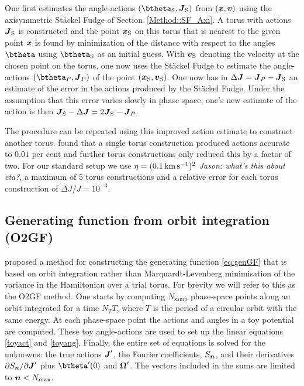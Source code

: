 \documentclass[useAMS,usenatbib,fleqn,a4paper]{mn2e}
\def\kms{\,{\rm km\,s^{-1}}}
\def\percent{\text{ per cent}}
\newcommand{\bs}[1]{\bmath{#1}}
\def\percent{\text{ per cent}}
\begin{document}
One first estimates the angle-actions $(\btheta_{\rm S},\boldsymbol{J}_{\rm S})$ from
$(\bs{x},\bs{v})$ using the axisymmetric St\"ackel Fudge of
Section~\ref{Method::SF_Axi}. A torus with actions $\boldsymbol{J}_{\rm S}$ is
constructed and the point $\bs{x}_{\rm S}$ on this torus that is nearest to the
given point $\bs{x}$ is found by minimization of the distance with respect to
the angles $\btheta$ using $\btheta_{\rm S}$ as an initial guess. With $\bs{v}_{\rm S}$
denoting the velocity at the chosen point on the torus, one now uses the
St\"ackel Fudge to estimate the angle-actions $(\btheta_P,\boldsymbol{J}_P)$
of the point $(\bs{x}_{\rm S},\bs{v}_{\rm S})$. One now has in
$\Delta\bs{J}=\bs{J}_P-\bs{J}_{\rm S}$ an estimate of the error in the actions
produced by the St\"ackel Fudge.  Under the
assumption that this error varies slowly in phase space, one's new estimate
of the action is then
$\boldsymbol{J}_{\rm S}-\Delta\boldsymbol{J}=2\boldsymbol{J}_{\rm S}-\boldsymbol{J}_P$.

The procedure can be repeated using this improved action estimate to
construct another torus. \cite{SandersBinney2015} found that a single torus
construction produced actions accurate to $0.01\percent$ and further torus
constructions only reduced this by a factor of two. For our standard setup we
use $\eta=(0.1\kms)^2$ {\sl Jason: what's this about eta?}, a maximum of $5$ torus constructions and a relative
error for each torus construction of $\Delta J/J=10^{-3}$. 

\subsection{Generating function from orbit integration (O2GF)}\label{Method::Genfunc}

\cite{SandersBinney2014} proposed a method for constructing the generating
function \eqref{eq:genGF} that is based on orbit integration rather than
Marquardt-Levenberg minimisation of the variance in the Hamiltonian over a
trial torus. For brevity we will refer to this as the O2GF method. One starts
by computing $N_\mathrm{samp}$ phase-space points along an orbit integrated
for a time $N_T T$, where $T$ is the period of a circular orbit with the same
energy. At each phase-space point the actions and angles in a toy potential
are computed. These toy angle-actions are used to set up the linear equations
\eqref{toyact} and \eqref{toyang}. Finally, the entire set of equations is
solved for the unknowns: the true actions $\bs{J}'$, the Fourier
coefficients, $S_{\bs{n}}$, and their derivatives $\partial
S_{\bs{n}}/\partial\bs{J}'$ plus $\btheta'(0)$ and $\bs{\Omega}'$. The
vectors included in the sums are limited to $\bs{n}<N_\mathrm{max}$.
\end{document}
